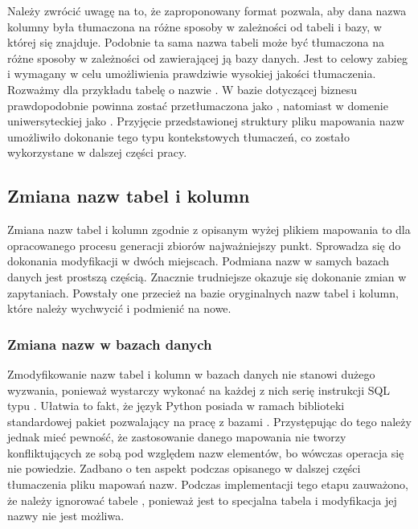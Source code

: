 \begin{minipage}{\linewidth}

\end{minipage}

Należy zwrócić uwagę na to, że zaproponowany format pozwala, aby dana nazwa kolumny była tłumaczona na różne sposoby w zależności od tabeli i bazy, w której się znajduje. Podobnie ta sama nazwa tabeli może być tłumaczona na różne sposoby w zależności od zawierającej ją bazy danych. Jest to celowy zabieg i wymagany w celu umożliwienia prawdziwie wysokiej jakości tłumaczenia. Rozważmy dla przykładu tabelę o nazwie . W bazie dotyczącej biznesu prawdopodobnie powinna zostać przetłumaczona jako , natomiast w domenie uniwersyteckiej jako . Przyjęcie przedstawionej struktury pliku mapowania nazw umożliwiło dokonanie tego typu kontekstowych tłumaczeń, co zostało wykorzystane w dalszej części pracy.

\subsection{Zmiana nazw tabel i kolumn}
Zmiana nazw tabel i kolumn zgodnie z opisanym wyżej plikiem mapowania to dla opracowanego procesu generacji zbiorów najważniejszy punkt. Sprowadza się do dokonania modyfikacji w dwóch miejscach. Podmiana nazw w samych bazach danych  jest prostszą częścią. Znacznie trudniejsze okazuje się dokonanie zmian w zapytaniach. Powstały one przecież na bazie oryginalnych nazw tabel i kolumn, które należy wychwycić i podmienić na nowe.

\subsubsection{Zmiana nazw w bazach danych}
Zmodyfikowanie nazw tabel i kolumn w bazach danych nie stanowi dużego wyzwania, ponieważ wystarczy wykonać na każdej z nich serię instrukcji SQL typu . Ułatwia to fakt, że język Python posiada w ramach biblioteki standardowej pakiet pozwalający na pracę z bazami . Przystępując do tego należy jednak mieć pewność, że zastosowanie danego mapowania nie tworzy konfliktujących ze sobą pod względem nazw elementów, bo wówczas operacja się nie powiedzie. Zadbano o ten aspekt podczas opisanego w dalszej części tłumaczenia pliku mapowań nazw. Podczas implementacji tego etapu zauważono, że należy ignorować tabele , ponieważ jest to specjalna tabela i modyfikacja jej nazwy nie jest możliwa.

